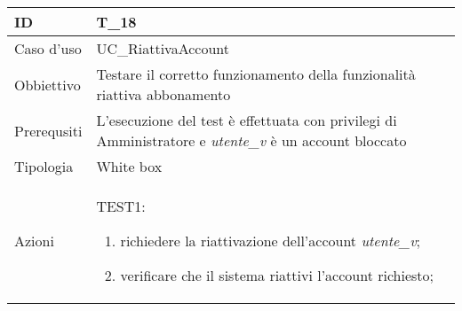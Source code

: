\begin{table}[hb]
    \centering
    \begin{tabular}{ |p{2cm}|p{10cm}|  }
        \hline
        ID          & T\_18                                                                                                       \\\hline
        Caso d'uso  & UC\_RiattivaAccount                                                                                         \\\hline
        Obbiettivo  & Testare il corretto funzionamento della funzionalità riattiva abbonamento                                   \\\hline
        Prerequsiti & L'esecuzione del test è effettuata con privilegi di Amministratore e \emph{utente\_v} è un account bloccato \\\hline
        Tipologia   & White box                                                                                                   \\\hline
        Azioni      &
        TEST1:
        \begin{enumerate}[nosep, topsep=0pt]
            \item richiedere la riattivazione dell'account \emph{utente\_v};
            \item verificare che il sistema riattivi l'account richiesto;
        \end{enumerate}
        \\\hline
    \end{tabular}
\end{table}

